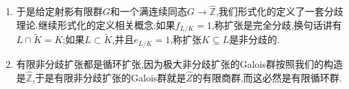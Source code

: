 \begin{enumerate}
\begin{proof}
		考虑元素阶数得到基本关系式.对于未必Galois的扩张$K\subseteq L$,取它的Galois闭包$K\subseteq L\subseteq M$,此即$G_L$在$G$中包含的极大的$G$的正规子群$\cap_{g\in G} g^{-1}G_Lg$,它对应的闭子群$G_M$对应的$M$是这里的Galois闭包.按照$K\subseteq M$和$L\subseteq M$都是Galois扩张,对应的基本关系式相除得到所求基本关系式.
	\end{proof}
    \item 于是给定射影有限群$G$和一个满连续同态$G\to\widehat{\mathbb{Z}}$,我们形式化的定义了一套分歧理论.继续形式化的定义相关概念:如果$f_{L/K}=1$,称扩张是完全分歧,换句话讲有$L\cap\widetilde{K}=K$;如果$L\subset\widetilde{K}$,并且$e_{L/K}=1$,称扩张$K\subseteq L$是非分歧的.
    \item 有限非分歧扩张都是循环扩张,因为极大非分歧扩张的Galois群按照我们的构造是$\widehat{\mathbb{Z}}$,于是有限非分歧扩张的Galois群就是$\widehat{Z}$的有限商群,而这必然是有限循环群.
\end{enumerate}


